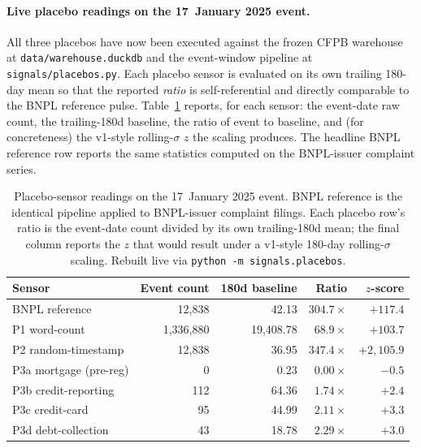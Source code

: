 \documentclass[11pt,letterpaper]{article}
\begin{document}
\paragraph{Live placebo readings on the 17~January 2025 event.}
All three placebos have now been executed against the frozen CFPB
warehouse at \texttt{data/warehouse.duckdb} and the event-window
pipeline at \texttt{signals/placebos.py}. Each placebo sensor is
evaluated on its own trailing 180-day mean so that the reported
\emph{ratio} is self-referential and directly comparable to the BNPL
reference pulse. Table~\ref{tab:placebos-live} reports, for each
sensor: the event-date raw count, the trailing-180d baseline, the
ratio of event to baseline, and (for concreteness) the
v1-style rolling-$\sigma$ $z$ the scaling produces. The headline BNPL
reference row reports the same statistics computed on the
BNPL-issuer complaint series.

\begin{table}[h]
\centering\small
\begin{tabular}{lrrrr}
\toprule
Sensor & Event count & 180d baseline & Ratio & $z$-score \\
\midrule
BNPL reference         & 12{,}838    & 42.13      & $304.7\times$ & $+117.4$ \\
\midrule
P1 word-count          & 1{,}336{,}880 & 19{,}408.78 & $68.9\times$  & $+103.7$ \\
P2 random-timestamp    & 12{,}838    & 36.95      & $347.4\times$ & $+2{,}105.9$ \\
P3a mortgage (pre-reg) & 0           & 0.23       & $0.00\times$  & $-0.5$ \\
P3b credit-reporting   & 112         & 64.36      & $1.74\times$  & $+2.4$ \\
P3c credit-card        & 95          & 44.99      & $2.11\times$  & $+3.3$ \\
P3d debt-collection    & 43          & 18.78      & $2.29\times$  & $+3.0$ \\
\bottomrule
\end{tabular}
\caption{Placebo-sensor readings on the 17~January 2025 event. BNPL
reference is the identical pipeline applied to BNPL-issuer complaint
filings. Each placebo row's ratio is the event-date count divided by
its own trailing-180d mean; the final column reports the $z$ that
would result under a v1-style 180-day rolling-$\sigma$ scaling.
Rebuilt live via \texttt{python -m signals.placebos}.}
\label{tab:placebos-live}
\end{table}
\end{document}
